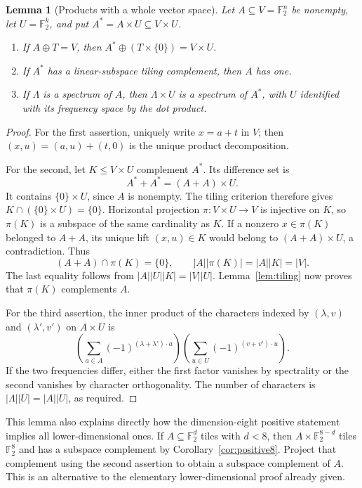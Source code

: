 \documentclass[11pt]{article}
\numberwithin{equation}{section}
\newtheorem{lemma}[theorem]{Lemma}
\theoremstyle{definition}
\theoremstyle{remark}\newtheorem{remark}[theorem]{Remark}
\newcommand{\F}{\mathbb F_2}
\begin{document}
\begin{lemma}[Products with a whole vector space]\label{lem:product}
Let $A\subseteq V=\F^n$ be nonempty, let $U=\F^k$, and put
$A^*=A\times U\subseteq V\times U$.
\begin{enumerate}
\item If $A\oplus T=V$, then $A^*\oplus(T\times\{0\})=V\times U$.
\item If $A^*$ has a linear-subspace tiling complement, then $A$ has one.
\item If $\Lambda$ is a spectrum of $A$, then $\Lambda\times U$ is a
spectrum of $A^*$, with $U$ identified with its frequency space by the
dot product.
\end{enumerate}
\end{lemma}
\begin{proof}
For the first assertion, uniquely write $x=a+t$ in $V$; then
$(x,u)=(a,u)+(t,0)$ is the unique product decomposition.

For the second, let $K\le V\times U$ complement $A^*$. Its difference
set is
\[
 A^*+A^*=(A+A)\times U.
\]
It contains $\{0\}\times U$, since $A$ is nonempty. The tiling
criterion therefore gives $K\cap(\{0\}\times U)=\{0\}$.
Horizontal projection $\pi:V\times U\to V$ is injective on $K$, so
$\pi(K)$ is a subspace of the same cardinality as $K$. If a nonzero
$x\in\pi(K)$ belonged to $A+A$, its unique lift $(x,u)\in K$ would
belong to $(A+A)\times U$, a contradiction. Thus
\[
 (A+A)\cap\pi(K)=\{0\},\qquad
 |A||\pi(K)|=|A||K|=|V|.
\]
The last equality follows from $|A||U||K|=|V||U|$.
Lemma~\ref{lem:tiling} now proves that $\pi(K)$ complements $A$.

For the third assertion, the inner product of the characters indexed by
$(\lambda,v)$ and $(\lambda',v')$ on $A\times U$ is
\[
 \left(\sum_{a\in A}(-1)^{(\lambda+\lambda')\cdot a}\right)
 \left(\sum_{u\in U}(-1)^{(v+v')\cdot u}\right).
\]
If the two frequencies differ, either the first factor vanishes by
spectrality or the second vanishes by character orthogonality.
The number of characters is $|\Lambda||U|=|A||U|$, as required.
\end{proof}

This lemma also explains directly how the dimension-eight positive
statement implies all lower-dimensional ones. If $A\subseteq\F^d$
tiles with $d<8$, then $A\times\F^{8-d}$ tiles $\F^8$ and has a
subspace complement by Corollary~\ref{cor:positive8}. Project that
complement using the second assertion to obtain a subspace complement
of $A$. This is an alternative to the elementary lower-dimensional proof
already given.
\end{document}
